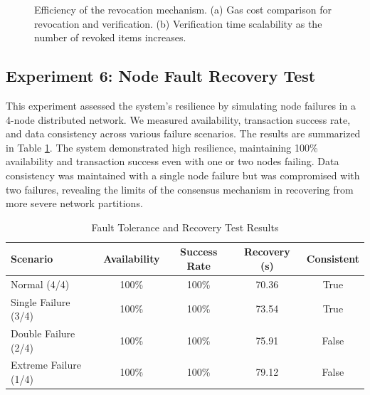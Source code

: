 \documentclass[lettersize,journal]{IEEEtran}
\begin{document}
\begin{itemize}
\begin{figure}[!t]
\centering
{}
\hfil
{}
\caption{Efficiency of the revocation mechanism. (a) Gas cost comparison for revocation and verification. (b) Verification time scalability as the number of revoked items increases.}
\label{fig:exp5}
\end{figure}

\subsection{Experiment 6: Node Fault Recovery Test}
This experiment assessed the system's resilience by simulating node failures in a 4-node distributed network. We measured availability, transaction success rate, and data consistency across various failure scenarios. The results are summarized in Table \ref{tab:fault_tolerance}. The system demonstrated high resilience, maintaining 100\% availability and transaction success even with one or two nodes failing. Data consistency was maintained with a single node failure but was compromised with two failures, revealing the limits of the consensus mechanism in recovering from more severe network partitions.

\begin{table}[!t]
\caption{Fault Tolerance and Recovery Test Results}
\label{tab:fault_tolerance}
\centering
\begin{tabular}{|l|c|c|c|c|}
\hline
\textbf{Scenario} & \textbf{Availability} & \textbf{Success Rate} & \textbf{Recovery (s)} & \textbf{Consistent} \\
\hline
Normal (4/4) & 100\% & 100\% & 70.36 & True \\
Single Failure (3/4) & 100\% & 100\% & 73.54 & True \\
Double Failure (2/4) & 100\% & 100\% & 75.91 & False \\
Extreme Failure (1/4) & 100\% & 100\% & 79.12 & False \\
\hline
\end{tabular}
\end{table}


\end{itemize}
\end{document}
